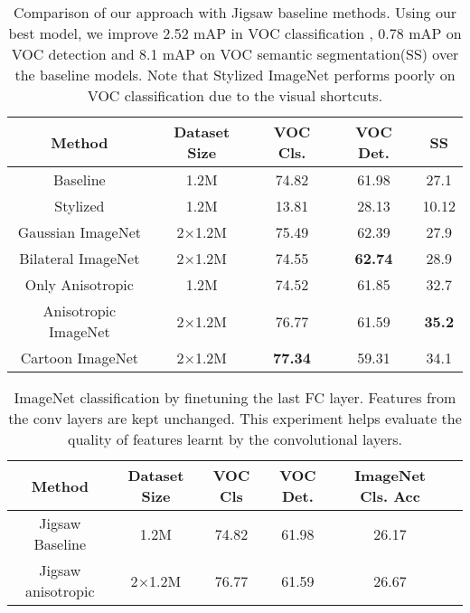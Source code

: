 \documentclass{bmvc2k}
\begin{document}
\begin{table*}
\begin{center}
\caption{Comparison of our approach with Jigsaw baseline methods. Using our best model, we improve 2.52 mAP in VOC classification , 0.78 mAP on VOC detection and 8.1 mAP on VOC semantic segmentation(SS) over the baseline models. Note that Stylized ImageNet performs poorly on VOC classification due to the visual shortcuts.}
\begin{tabular}{ccccc}  
\toprule
Method    & Dataset Size & VOC Cls. & VOC Det. & SS \\
\midrule
Baseline     & 1.2M & 74.82    & 61.98  & 27.1  \\
Stylized \cite{Geirhos2018ImageNettrainedCA}     & 1.2M & 13.81    & 28.13  &10.12   \\
Gaussian ImageNet & 2$\times$1.2M    & 75.49    & 62.39    &27.9  \\
Bilateral ImageNet & 2$\times$1.2M    & 74.55    & \textbf{62.74}    &28.9   \\
Only Anisotropic   & 1.2M & 74.52    & {61.85}  & 32.7     \\
Anisotropic ImageNet & 2$\times$1.2M    & {76.77}    & 61.59   &\textbf{35.2}    \\
Cartoon ImageNet & 2$\times$1.2M    & \textbf{77.34}    & 59.31   &  34.1\\
\bottomrule
\end{tabular}
\label{tab:Stylzied_Experiments}
\end{center}
\end{table*}
\begin{table*}[t!]
\caption{ImageNet classification by finetuning the last FC layer. Features from the conv layers are kept unchanged. This experiment helps evaluate the quality of features learnt by the convolutional layers.}
\vspace{-0.5em}
\begin{center}
{
\begin{tabular}{cccccc}  
\toprule
Method    & Dataset Size & VOC Cls & VOC Det. & ImageNet Cls. Acc \\
\midrule
Jigsaw Baseline     & 1.2M & 74.82    & 61.98  &26.17  \\
Jigsaw anisotropic   & 2$\times$1.2M& 76.77    & 61.59  & 26.67    \\
\bottomrule
\end{tabular}
\label{ref:Jigsaw_Imgagenet_Experiments}
}
\vspace{-1em}
\end{center}
\end{table*}
\end{document}
